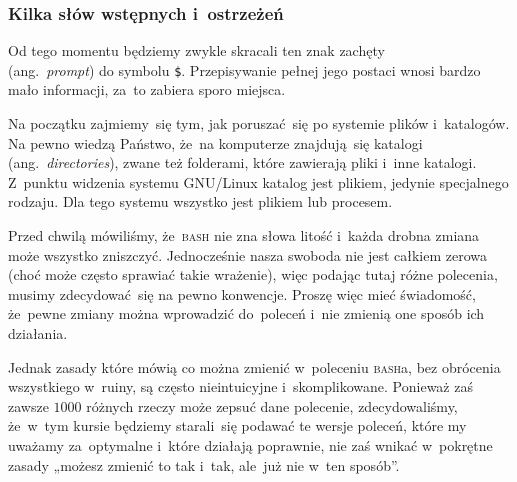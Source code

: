 \documentclass[10pt,t]{beamer}
\begin{document}
\begin{frame}
  \frametitle{Kilka słów wstępnych i~ostrzeżeń}


  Od tego momentu będziemy zwykle skracali ten znak zachęty \\
  (ang.~\textit{prompt}) do symbolu \texttt{\$}. Przepisywanie pełnej jego
  postaci wnosi bardzo mało informacji, za~to zabiera sporo miejsca.

  Na początku zajmiemy~się tym, jak poruszać~się po systemie plików
  i~katalogów. Na pewno wiedzą Państwo, że~na komputerze znajdują~się
  katalogi (ang.~\textit{directories}), zwane też folderami, które zawierają
  pliki i~inne katalogi. Z~punktu widzenia systemu GNU/Linux
  katalog jest plikiem, jedynie specjalnego rodzaju. Dla tego systemu
  wszystko jest plikiem lub procesem.



  Przed chwilą mówiliśmy, że~\textsc{bash} nie zna słowa litość i~każda
  drobna zmiana może wszystko zniszczyć. Jednocześnie nasza swoboda nie jest
  całkiem zerowa (choć może często sprawiać takie wrażenie), więc
  podając tutaj różne polecenia, musimy zdecydować~się na pewno konwencje.
  Proszę więc mieć świadomość, że~\alert{pewne} zmiany można wprowadzić
  do~poleceń i~nie zmienią one sposób ich działania.

  Jednak zasady które mówią co \alert{można} zmienić w~poleceniu
  \textsc{bash}a, bez obrócenia wszystkiego w~ruiny, są często nieintuicyjne
  i~skomplikowane. Ponieważ zaś zawsze $1000$ różnych rzeczy może zepsuć
  dane polecenie, zdecydowaliśmy, że~w~tym kursie będziemy starali~się
  podawać te wersje poleceń, które my uważamy za~optymalne i~które działają
  poprawnie, nie zaś wnikać w~pokrętne zasady „możesz zmienić to tak i~tak,
  ale~już nie w~ten sposób”.

\end{frame}
\end{document}
